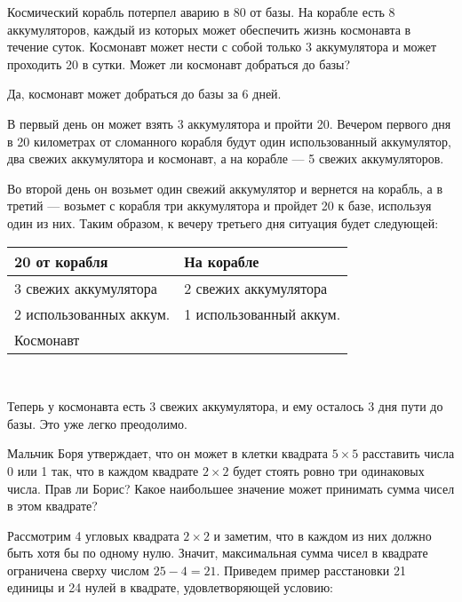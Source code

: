 ﻿

\def\km#1{\SI{#1}{\text{км}}}

\begin{enumerate}

	\itA Космический корабль потерпел аварию в \km{80} от базы. На корабле есть 8 аккумуляторов, каждый из которых может обеспечить жизнь космонавта в течение суток. Космонавт может нести с собой только 3 аккумулятора и может проходить \km{20} в сутки. Может ли космонавт добраться до базы?
	
	\itr Да, космонавт может добраться до базы за 6 дней.
	
	В первый день он может взять 3 аккумулятора и пройти \km{20}. Вечером первого дня в 20 километрах от сломанного корабля будут один использованный аккумулятор, два свежих аккумулятора и космонавт, а на корабле — 5 свежих аккумуляторов.
	
	Во второй день он возьмет один свежий аккумулятор и вернется на корабль, а в третий — возьмет с корабля три аккумулятора и пройдет \km{20} к базе, используя один из них. Таким образом, к вечеру третьего дня ситуация будет следующей:
	
	\begin{center}\begin{tabular}{|l|l|} \hline
		\km{20} от корабля & На корабле \\ \hline
	 	3 свежих аккумулятора & 2 свежих аккумулятора \\
	 	2 использованных аккум. & 1 использованный аккум. \\
	 	Космонавт & \\ \hline
	\end{tabular}\medskip \\\end{center}
	
	Теперь у космонавта есть 3 свежих аккумулятора, и ему осталось 3 дня пути до базы. Это уже легко преодолимо.

	\itB Мальчик Боря утверждает, что он может в клетки квадрата $5\times 5$ расставить числа 0 или 1 так, что в каждом квадрате $2\times 2$ будет стоять ровно три одинаковых числа. Прав ли Борис? Какое наибольшее значение может принимать сумма чисел в этом квадрате?
	
	\itr Рассмотрим 4 угловых квадрата $2 \times 2$ и заметим, что в каждом из них должно быть хотя бы по одному нулю. Значит, максимальная сумма чисел в квадрате ограничена сверху числом $25-4=21$. Приведем пример расстановки 21 единицы и 24 нулей в квадрате, удовлетворяющей условию:
	

\end{enumerate}
